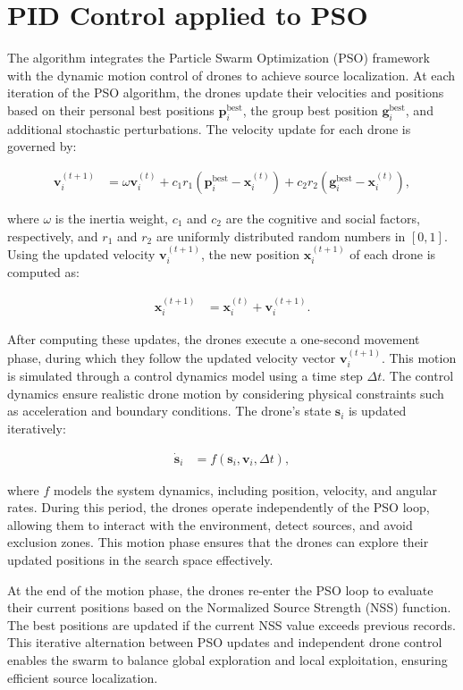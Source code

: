 \section{PID Control applied to PSO}
The algorithm integrates the Particle Swarm Optimization (PSO) 
framework with the dynamic motion control of drones to achieve source localization. 
At each iteration of the PSO algorithm, the drones update their velocities and positions 
based on their personal best positions $\mathbf{p}_i^{\text{best}}$, the group best position 
$\mathbf{g}_i^{\text{best}}$, and additional stochastic perturbations. 
The velocity update for each drone is governed by:

\begin{align}
    \mathbf{v}_i^{(t+1)} &= \omega \mathbf{v}_i^{(t)} + c_1 r_1 (\mathbf{p}_i^{\text{best}} - \mathbf{x}_i^{(t)}) + c_2 r_2 (\mathbf{g}_i^{\text{best}} - \mathbf{x}_i^{(t)}),
\end{align}

where $\omega$ is the inertia weight, $c_1$ and $c_2$ are the cognitive and social factors, 
respectively, and $r_1$ and $r_2$ are uniformly distributed random numbers in $[0,1]$. 
Using the updated velocity $\mathbf{v}_i^{(t+1)}$, the new position $\mathbf{x}_i^{(t+1)}$ of each drone is computed as:

\begin{align}
    \mathbf{x}_i^{(t+1)} &= \mathbf{x}_i^{(t)} + \mathbf{v}_i^{(t+1)}.
\end{align}

After computing these updates, the drones execute a one-second movement phase, 
during which they follow the updated velocity vector $\mathbf{v}_i^{(t+1)}$. 
This motion is simulated through a control dynamics model using a time step $\Delta t$. 
The control dynamics ensure realistic drone motion by considering physical constraints such as acceleration and boundary conditions. 
The drone’s state $\mathbf{s}_i$ is updated iteratively:

\begin{align}
    \dot{\mathbf{s}}_i &= f(\mathbf{s}_i, \mathbf{v}_i, \Delta t),
\end{align}

where $f$ models the system dynamics, including position, velocity, and angular rates. 
During this period, the drones operate independently of the PSO loop, allowing them to 
interact with the environment, detect sources, and avoid exclusion zones. This motion phase ensures that
the drones can explore their updated positions in the search space effectively.

At the end of the motion phase, the drones re-enter the PSO loop to evaluate their current positions 
based on the Normalized Source Strength (NSS) function. The best positions are updated if the current 
NSS value exceeds previous records. This iterative alternation between PSO updates and independent drone 
control enables the swarm to balance global exploration and local exploitation, 
ensuring efficient source localization.
